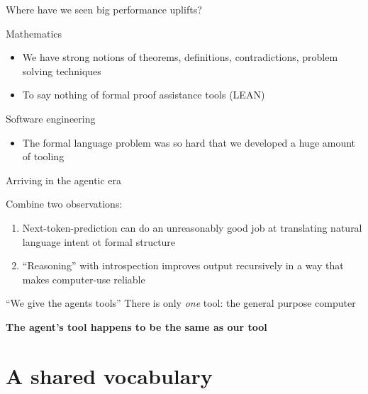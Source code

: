 \documentclass[aspectratio=1610, xcolor={dvipsnames}]{beamer}
\begin{document}
\begin{frame}{Where have we seen big performance uplifts?}
    \label{chat:evals}
    \begin{block}{Mathematics}
        \begin{itemize}
            \item We have strong notions of theorems, definitions, contradictions, problem solving techniques
            \item To say nothing of formal proof assistance tools (LEAN) \hyperlink{app:math_bench}{}

        \end{itemize}
    \end{block}

    \begin{block}{Software engineering}
        \begin{itemize}
            \item The formal language problem was so hard that we developed a huge amount of tooling \hyperlink{app:swe_bench}{}
        \end{itemize}
    \end{block}
\end{frame}

\begin{frame}{Arriving in the agentic era}
    \begin{block}{Combine two observations:}
        \begin{enumerate}
            \item Next-token-prediction can do an unreasonably good job at translating natural language intent ot formal structure
            \item ``Reasoning'' with introspection improves output recursively in a way that makes computer-use reliable
        \end{enumerate}
    \end{block}

    \pause\begin{alertblock}{``We give the agents tools''}
        \vspace{0.8em}
        There is only \textit{one} tool: the general purpose computer
    \end{alertblock}

    \textbf{The agent's tool happens to be the same as our tool}

\end{frame}


\section{A shared vocabulary}
\end{document}
